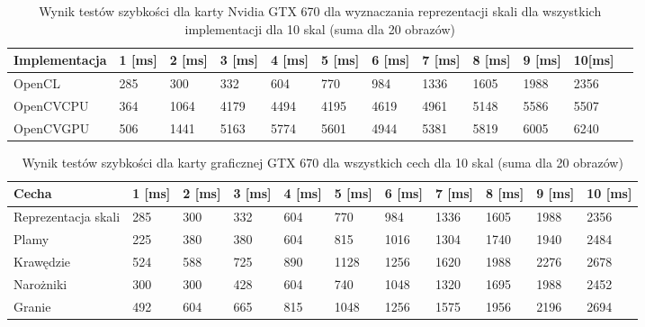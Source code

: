 \begin{table}[h]
\caption{Wynik testów szybkości dla karty Nvidia GTX 670 dla wyznaczania reprezentacji skali dla wszystkich implementacji dla 10 skal (suma dla 20 obrazów)}
\label{tab:allGTX}

\begin{tabular}{|l|l|l|l|l|l|l|l|l|l|l|l|}
\hline
Implementacja & 1 [ms] & 2 [ms] & 3 [ms] & 4  [ms]  & 5 [ms]   & 6 [ms]   & 7  [ms]  & 8 [ms]   & 9 [ms]    & 10[ms]    \\ \hline
OpenCL               & 285        & 300               & 332      & 604  & 770  & 984  & 1336 & 1605 & 1988  & 2356  \\ \hline
OpenCVCPU            & 364        & 1064              & 4179     & 4494 & 4195 & 4619 & 4961 & 5148 & 5586  & 5507  \\ \hline
OpenCVGPU            & 506        & 1441              & 5163     & 5774 & 5601 & 4944 & 5381 & 5819 & 6005  & 6240  \\ \hline
\end{tabular}
\end{table}
\begin{table}[h]
\caption{Wynik testów szybkości dla karty graficznej GTX 670 dla wszystkich cech dla 10 skal (suma dla 20 obrazów)}
\label{tab:allCechy}

\begin{tabular}{|p{2cm}|l|l|l|l|l|l|l|l|l|l|}
\hline
Cecha               & 1  [ms] & 2  [ms] & 3  [ms] & 4  [ms] & 5    [ms]& 6    [ms]& 7    [ms]& 8    [ms]& 9    [ms]& 10   [ms]\\ \hline
Reprezentacja skali & 285 & 300 & 332 & 604 & 770  & 984  & 1336 & 1605 & 1988 & 2356 \\ \hline
Plamy               & 225 & 380 & 380 & 604 & 815  & 1016 & 1304 & 1740 & 1940 & 2484 \\ \hline
Krawędzie           & 524 & 588 & 725 & 890 & 1128 & 1256 & 1620 & 1988 & 2276 & 2678 \\ \hline
Narożniki           & 300 & 300 & 428 & 604 & 740  & 1048 & 1320 & 1695 & 1988 & 2452 \\ \hline
Granie              & 492 & 604 & 665 & 815 & 1048 & 1256 & 1575 & 1956 & 2196 & 2694 \\ \hline
\end{tabular}
\end{table}